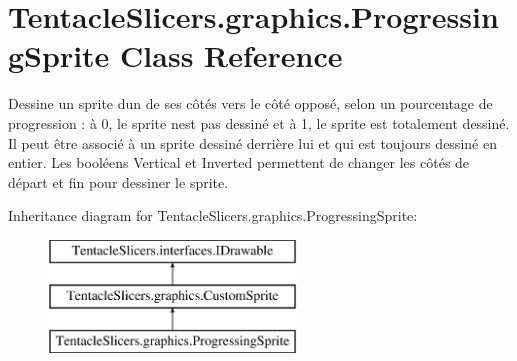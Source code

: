 \hypertarget{class_tentacle_slicers_1_1graphics_1_1_progressing_sprite}{}\section{Tentacle\+Slicers.\+graphics.\+Progressing\+Sprite Class Reference}
\label{class_tentacle_slicers_1_1graphics_1_1_progressing_sprite}


Dessine un sprite d\textquotesingle{}un de ses côtés vers le côté opposé, selon un pourcentage de progression \+: à 0, le sprite n\textquotesingle{}est pas dessiné et à 1, le sprite est totalement dessiné. Il peut être associé à un sprite dessiné derrière lui et qui est toujours dessiné en entier. Les booléens Vertical et Inverted permettent de changer les côtés de départ et fin pour dessiner le sprite.  


Inheritance diagram for Tentacle\+Slicers.\+graphics.\+Progressing\+Sprite\+:\begin{figure}[H]
\begin{center}
\leavevmode
\includegraphics[height=3.000000cm]{class_tentacle_slicers_1_1graphics_1_1_progressing_sprite}
\end{center}
\end{figure}
